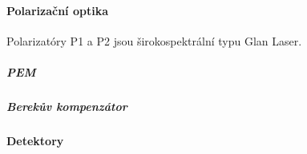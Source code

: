 \paragraph{Polarizační optika}
Polarizatóry P1 a P2 jsou širokospektrální typu Glan Laser.

\subparagraph{PEM}
\cite{minarModulacePolarizaceSvetelne2004}
\subparagraph{Berekův kompenzátor}
\cite{schusserSkryteKouzloPolarizace2014}

\paragraph{Detektory}
\cite{hovorakovaCharakterizaceInfracervenehoDetektoru}
